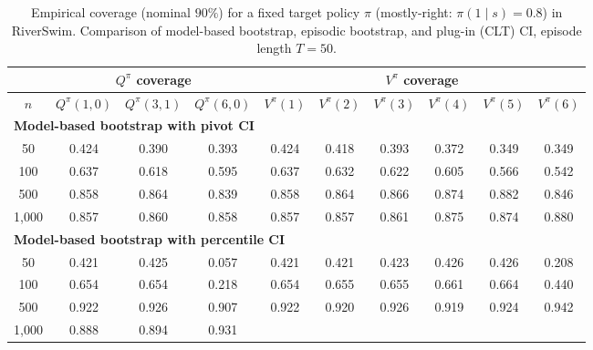 \documentclass{article}
\numberwithin{equation}{section}
\begin{document}
\begin{table}[ht]
\centering
\caption{Empirical coverage (nominal $90\%$) for a fixed target policy $\pi$ (mostly-right: $\pi(1\mid s)=0.8$) in RiverSwim. Comparison of model-based bootstrap, episodic bootstrap, and plug-in (CLT) CI, episode length $T=50$.}
\label{tab:riverswim-mostly-right-coverage-90}
\begin{tabular}{c|ccc|cccccc}
\hline
& \multicolumn{3}{c|}{$Q^\pi$ coverage} & \multicolumn{6}{c}{$V^\pi$ coverage} \\ \hline
$n$
& $Q^\pi(1,0)$ & $Q^\pi(3,1)$ & $Q^\pi(6,0)$
& $V^\pi(1)$ & $V^\pi(2)$ & $V^\pi(3)$ & $V^\pi(4)$ & $V^\pi(5)$ & $V^\pi(6)$ \\
\hline
\multicolumn{10}{l}{\textbf{Model-based bootstrap with pivot CI}} \\ \hline
50
& 0.424 & 0.390 & 0.393
& 0.424 & 0.418 & 0.393 & 0.372 & 0.349 & 0.349 \\
100
& 0.637 & 0.618 & 0.595
& 0.637 & 0.632 & 0.622 & 0.605 & 0.566 & 0.542 \\
500
& \cellcolor{covheat!79!white}0.858 & \cellcolor{covheat!82!white}0.864 & \cellcolor{covheat!69!white}0.839
& \cellcolor{covheat!79!white}0.858 & \cellcolor{covheat!82!white}0.864 & \cellcolor{covheat!83!white}0.866 & \cellcolor{covheat!87!white}0.874 & \cellcolor{covheat!91!white}0.882 & \cellcolor{covheat!73!white}0.846 \\
1{,}000
& \cellcolor{covheat!78!white}0.857 & \cellcolor{covheat!80!white}0.860 & \cellcolor{covheat!79!white}0.858
& \cellcolor{covheat!78!white}0.857 & \cellcolor{covheat!78!white}0.857 & \cellcolor{covheat!80!white}0.861 & \cellcolor{covheat!87!white}0.875 & \cellcolor{covheat!87!white}0.874 & \cellcolor{covheat!90!white}0.880 \\
\hline
\multicolumn{10}{l}{\textbf{Model-based bootstrap with percentile CI}} \\ \hline
50
& 0.421 & 0.425 & 0.057
& 0.421 & 0.421 & 0.423 & 0.426 & 0.426 & 0.208 \\
100
& 0.654 & 0.654 & 0.218
& 0.654 & 0.655 & 0.655 & 0.661 & 0.664 & 0.440 \\
500
& \cellcolor{covheat!100!white}0.922 & \cellcolor{covheat!100!white}0.926 & \cellcolor{covheat!100!white}0.907
& \cellcolor{covheat!100!white}0.922 & \cellcolor{covheat!100!white}0.920 & \cellcolor{covheat!100!white}0.926 & \cellcolor{covheat!100!white}0.919 & \cellcolor{covheat!100!white}0.924 & \cellcolor{covheat!100!white}0.942 \\
1{,}000
& \cellcolor{covheat!94!white}0.888 & \cellcolor{covheat!97!white}0.894 & \cellcolor{covheat!100!white}0.931

\end{tabular}
\end{table}
\end{document}
